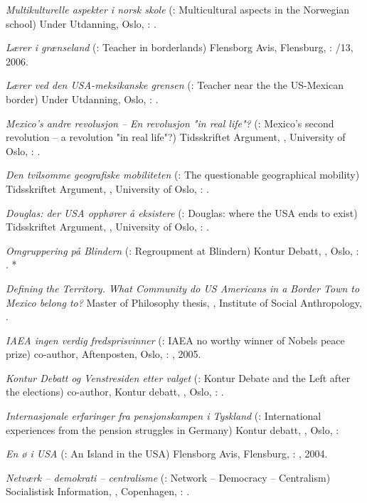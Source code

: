 \begin{itemize}
{\item \textit{Multikulturelle aspekter i norsk skole} (\english: Multicultural aspects in the Norwegian school) Under Utdanning, Oslo, \Norway: .
\item \textit{Lærer i grænseland} (\english: Teacher in borderlands) Flensborg Avis, Flensburg, \Germany:  /13, 2006.
\item \textit{Lærer ved den USA-meksikanske grensen} (\english: Teacher near the the US-Mexican border) Under Utdanning, Oslo, \Norway: .
\item \textit{Mexico's andre revolusjon -- En revolusjon "in real life"?} (\english: Mexico's second revolution -- a revolution "in real life"?) Tidsskriftet Argument, , University of Oslo, \Norway: .
\item \textit{Den tvilsomme geografiske mobiliteten} (\english: The questionable geographical mobility) Tidsskriftet Argument, , University of Oslo, \Norway: .


\item \textit{Douglas: der USA opphører å eksistere} (\english: Douglas: where the USA ends to exist) Tidsskriftet Argument, , University of Oslo, \Norway: .

\item \textit{Omgruppering på Blindern} (\english: Regroupment at Blindern) Kontur Debatt, , Oslo, \Norway: . *
\item \textit{Defining the Territory. What Community do US Americans in a Border Town to Mexico belong to?} Master of Philosophy thesis, , Institute of Social Anthropology, \uio.
\item \textit{IAEA ingen verdig fredsprisvinner} (\english: IAEA no worthy winner of Nobels peace prize) co-author, Aftenposten, Oslo, \Norway: , 2005.
\item \textit{Kontur Debatt og Venstresiden etter valget} (\english: Kontur Debate and the Left after the elections) co-author, Kontur debatt, , Oslo, \Norway: .
\item \textit{Internasjonale erfaringer fra pensjonskampen i Tyskland} (\english: International experiences from the pension struggles in Germany) Kontur debatt, , Oslo, \Norway: 
\item \textit{En ø i USA} (\english: An Island in the USA) Flensborg Avis, Flensburg, \Germany: , 2004.

\item \textit{Netværk – demokrati – centralisme} (\english: Network -- Democracy -- Centralism) Socialistisk Information, , Copenhagen, \Denmark: .

}

\end{itemize}

